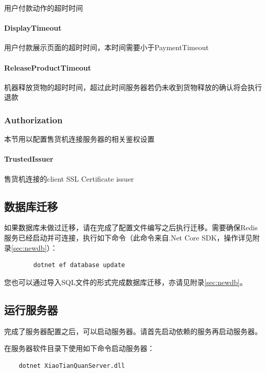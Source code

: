 \documentclass[a4paper,11pt]{article}
\theoremstyle{definition}
\begin{document}
用户付款动作的超时时间

\paragraph{DisplayTimeout}


用户付款展示页面的超时时间，本时间需要小于PaymentTimeout

\paragraph{ReleaseProductTimeout}


机器释放货物的超时时间，超过此时间服务器若仍未收到货物释放的确认将会执行退款

\subsubsection{Authorization}
本节用以配置售货机连接服务器的相关鉴权设置

\paragraph{TrustedIssuer}


售货机连接的client SSL Certificate issuer

\subsection{数据库迁移}

如果数据库未做过迁移，请在完成了配置文件编写之后执行迁移。需要确保Redis服务已经启动并可连接，执行如下命令（此命令来自.Net Core SDK，操作详见附录\ref{sec:newdb}）：
    \begin{verbatim}
        dotnet ef database update
    \end{verbatim}

您也可以通过导入SQL文件的形式完成数据库迁移，亦请见附录\ref{sec:newdb}。

\subsection{运行服务器}

完成了服务器配置之后，可以启动服务器。请首先启动依赖的服务再启动服务器。

在服务器软件目录下使用如下命令启动服务器：

    \begin{verbatim}
    dotnet XiaoTianQuanServer.dll
    \end{verbatim}
\end{document}
